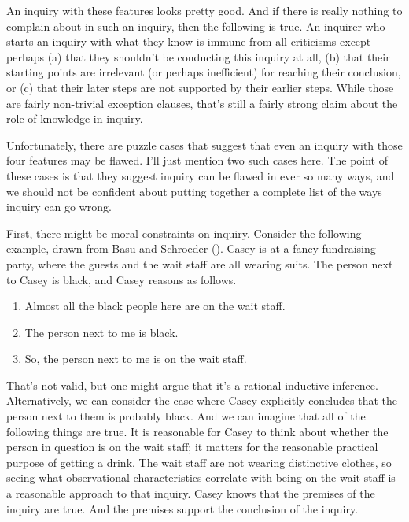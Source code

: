 \documentclass[
  12pt,
  letterpaper,
]{scrbook}
\providecommand{\tightlist}{%
  \setlength{\itemsep}{0pt}\setlength{\parskip}{0pt}}\usepackage{longtable,booktabs,array}
\begin{document}
An inquiry with these features looks pretty good. And if there is really
nothing to complain about in such an inquiry, then the following is
true. An inquirer who starts an inquiry with what they know is immune
from all criticisms except perhaps (a) that they shouldn't be conducting
this inquiry at all, (b) that their starting points are irrelevant (or
perhaps inefficient) for reaching their conclusion, or (c) that their
later steps are not supported by their earlier steps. While those are
fairly non-trivial exception clauses, that's still a fairly strong claim
about the role of knowledge in inquiry.

Unfortunately, there are puzzle cases that suggest that even an inquiry
with those four features may be flawed. I'll just mention two such cases
here. The point of these cases is that they suggest inquiry can be
flawed in ever so many ways, and we should not be confident about
putting together a complete list of the ways inquiry can go wrong.

First, there might be moral constraints on inquiry. Consider the
following example, drawn from Basu and Schroeder
(). Casey is at a fancy
fundraising party, where the guests and the wait staff are all wearing
suits. The person next to Casey is black, and Casey reasons as follows.

\begin{enumerate}
\def\labelenumi{\arabic{enumi}.}
\tightlist
\item
  Almost all the black people here are on the wait staff.
\item
  The person next to me is black.
\item
  So, the person next to me is on the wait staff.
\end{enumerate}

That's not valid, but one might argue that it's a rational inductive
inference. Alternatively, we can consider the case where Casey
explicitly concludes that the person next to them is probably black. And
we can imagine that all of the following things are true. It is
reasonable for Casey to think about whether the person in question is on
the wait staff; it matters for the reasonable practical purpose of
getting a drink. The wait staff are not wearing distinctive clothes, so
seeing what observational characteristics correlate with being on the
wait staff is a reasonable approach to that inquiry. Casey knows that
the premises of the inquiry are true. And the premises support the
conclusion of the inquiry.
\end{document}
